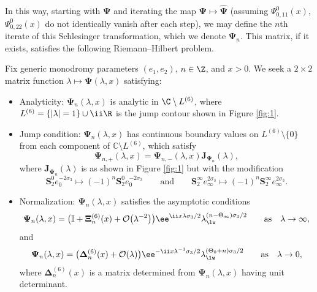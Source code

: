 In this way, starting with $\mathbf{\Psi}$ and iterating the map $\mathbf{\Psi \mapsto \hat{\mathbf{\Psi}}}$ (assuming $\Psi^0_{0, 11}(x)$, $\Psi^0_{0, 22}(x)$ do not identically vanish after each step), we may define the $n$th iterate of this Schlesinger transformation, which we denote $\mathbf{\Psi}_n$. This matrix, if it exists, satisfies the following Riemann--Hilbert problem.
\begin{rhp} \label{rhp:initial-with-n}
Fix generic monodromy parameters $( e_1, e_2 )$, $n \in \Z$, and $x>0$. We seek a $2 \times 2$ matrix function $\lambda\mapsto\mathbf \Psi(\lambda, x)$ satisfying:
\begin{itemize}\itemsep=0pt
\item  Analyticity: $\mathbf \Psi_n (\lambda, x)$ is analytic in $\C \setminus L^{(6)}$, where $L^{(6)} = \{ | \lambda| = 1\} \cup \ii \R$ is the jump contour shown in Figure {\rm \ref{fig:1}}.
\item  Jump condition: $\mathbf \Psi_n (\lambda, x)$ has continuous boundary values on $L^{(6)} \setminus \{0\}$ from each component of $\mathbb{C}\setminus L^{(6)}$, which satisfy
\[\mathbf \Psi_{n, +} (\lambda, x) = \mathbf \Psi_{n, -} (\lambda, x) \mathbf J_{\mathbf \Psi_n}(\lambda),\] where $\mathbf J_{\mathbf \Psi_n}(\lambda)$ is as shown in Figure {\rm \ref{fig:1}} but with the modification
\[
\mathbf{S}_2^0 e_0^{-2\sigma_3} \mapsto (-1)^n\mathbf{S}_2^0 e_0^{-2\sigma_3} \qquad \text{and} \qquad \mathbf{S}_2^\infty e_\infty^{2\sigma_3} \mapsto (-1)^n \mathbf{S}_2^\infty e_\infty^{2\sigma_3}.
\]
\item  Normalization: $\mathbf \Psi_n(\lambda,x)$ satisfies the asymptotic conditions
\begin{equation}
\label{eq:Psi-n-asymptotic-infinity}
\boldsymbol \Psi_n(\lambda, x) = \big( \mathbb{I}+\mathbf{\Xi}^{(6)}_n(x) + \mathcal{O}\big(\lambda^{-2}\big) \big) \ee^{\ii x \lambda \sigma_3 /2} \lambda_{\lw}^{(n - \Theta_\infty) \sigma_3/2} \qquad \text{as} \quad \lambda \to \infty,
\end{equation}
and
\begin{equation}
\label{eq:Psi-n-asymptotic-zero}
\boldsymbol \Psi_n(\lambda, x) = \big( \mathbf{\Delta}^{(6)}_n(x) + \mathcal{O}(\lambda) \big) \ee^{-\ii x \lambda^{-1} \sigma_3 /2} \lambda_{\lw}^{(\Theta_0 + n) \sigma_3/2} \qquad \text{as} \quad \lambda \to 0,
\end{equation}
where $\mathbf{\Delta}^{(6)}_n(x)$ is a matrix determined from $\mathbf{\Psi}_n(\lambda,x)$ having unit determinant.
\end{itemize}
\end{rhp}
